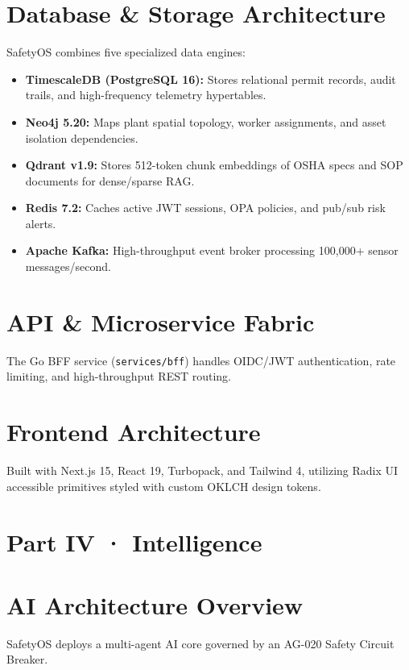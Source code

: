 \documentclass[11pt,a4paper]{article}
\begin{document}
\section{Database \& Storage Architecture}
SafetyOS combines five specialized data engines:
\begin{itemize}
    \item \textbf{TimescaleDB (PostgreSQL 16):} Stores relational permit records, audit trails, and high-frequency telemetry hypertables.
    \item \textbf{Neo4j 5.20:} Maps plant spatial topology, worker assignments, and asset isolation dependencies.
    \item \textbf{Qdrant v1.9:} Stores 512-token chunk embeddings of OSHA specs and SOP documents for dense/sparse RAG.
    \item \textbf{Redis 7.2:} Caches active JWT sessions, OPA policies, and pub/sub risk alerts.
    \item \textbf{Apache Kafka:} High-throughput event broker processing 100,000+ sensor messages/second.
\end{itemize}

\section{API \& Microservice Fabric}
The Go BFF service (\texttt{services/bff}) handles OIDC/JWT authentication, rate limiting, and high-throughput REST routing.

\section{Frontend Architecture}
Built with Next.js 15, React 19, Turbopack, and Tailwind 4, utilizing Radix UI accessible primitives styled with custom OKLCH design tokens.

\newpage
\section*{Part IV · Intelligence}

\section{AI Architecture Overview}
SafetyOS deploys a multi-agent AI core governed by an AG-020 Safety Circuit Breaker.
\end{document}
